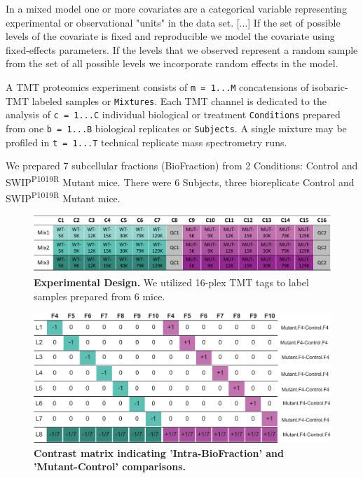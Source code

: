 \documentclass[11pt]{elife}\usepackage[]{graphicx}\usepackage[]{color}
\begin{document}
\begin{displayquote}
	In a mixed model one or more covariates 
	are a categorical variable  representing experimental or 
	observational "units" in the data set. 
	[...]
	If the set of possible levels of the covariate is fixed and reproducible 
	we model the covariate using fixed-effects parameters. 
	If the levels that we observed represent a random sample from
	the set of all possible levels we incorporate random effects in the
	model.
\end{displayquote}

A TMT proteomics experiment consists of \texttt{m = 1...M} concatensions of 
isobaric-TMT labeled samples or \texttt{Mixtures}. 
Each TMT channel is dedicated to the analysis of \texttt{c = 1...C}
individual biological or treatment \texttt{Conditions} prepared from one
\texttt{b = 1...B} biological replicates or \texttt{Subjects}. 
A single mixture may be profiled in \texttt{t = 1...T} technical replicate 
mass spectrometry runs. 

We prepared 7 subcellular fractions (BioFraction) from 2 Conditions: 
Control and SWIP\textsuperscript{P1019R} Mutant mice. 
There were 6 Subjects, three bioreplicate Control and 
SWIP\textsuperscript{P1019R} Mutant mice.

\begin{figure}[h]
  \begin{fullwidth}
  \begin{center}
	  \includegraphics[width=0.9\paperwidth,keepaspectratio]{design}
	  \caption{\textbf{Experimental Design.} We utilized 16-plex
	  TMT tags to label samples prepared from 6 mice.}
	  \label{fig:design}
  \end{center}
  \end{fullwidth}
\end{figure}


\begin{figure}[h]
  \begin{fullwidth}
  \begin{center}
	  \includegraphics[width=0.9\paperwidth,keepaspectratio]{contrasts}
	  \caption{\textbf{Contrast matrix indicating 'Intra-BioFraction' and
	  'Mutant-Control' comparisons.}} 
	  \label{fig:contrasts}
  \end{center}
  \end{fullwidth}
\end{figure}
\end{document}
